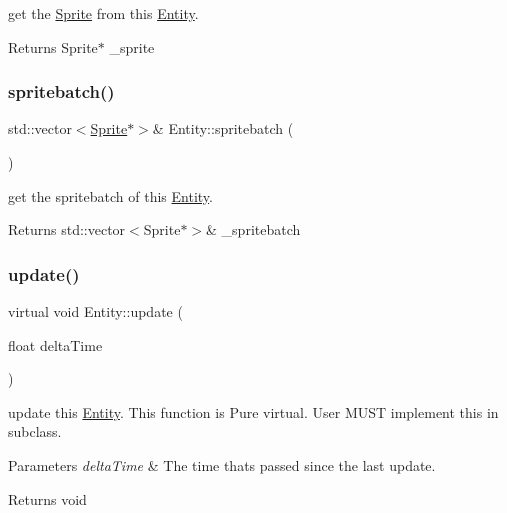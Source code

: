 get the \hyperlink{class_sprite}{Sprite} from this \hyperlink{class_entity}{Entity}. 

\begin{DoxyReturn}{Returns}
Sprite$\ast$ \+\_\+sprite 
\end{DoxyReturn}
\mbox{\label{class_entity_a103d3fc8fff63075df60502c1966a7bc}} 
\subsubsection{\texorpdfstring{spritebatch()}{spritebatch()}}
{\footnotesize\ttfamily std\+::vector$<$\hyperlink{class_sprite}{Sprite}$\ast$$>$\& Entity\+::spritebatch (\begin{DoxyParamCaption}{ }\end{DoxyParamCaption})\hspace{0.3cm}{\ttfamily [inline]}}



get the spritebatch of this \hyperlink{class_entity}{Entity}. 

\begin{DoxyReturn}{Returns}
std\+::vector$<$\+Sprite$\ast$$>$\& \+\_\+spritebatch 
\end{DoxyReturn}
\mbox{\label{class_entity_a7082aeb577c91707cc28edce571320f7}} 
\subsubsection{\texorpdfstring{update()}{update()}}
{\footnotesize\ttfamily virtual void Entity\+::update (\begin{DoxyParamCaption}\item[{float}]{delta\+Time }\end{DoxyParamCaption})\hspace{0.3cm}{\ttfamily [pure virtual]}}



update this \hyperlink{class_entity}{Entity}. This function is Pure virtual. User M\+U\+ST implement this in subclass. 


\begin{DoxyParams}{Parameters}
{\em delta\+Time} & The time that\textquotesingle{}s passed since the last update. \\
\hline
\end{DoxyParams}
\begin{DoxyReturn}{Returns}
void 
\end{DoxyReturn}



